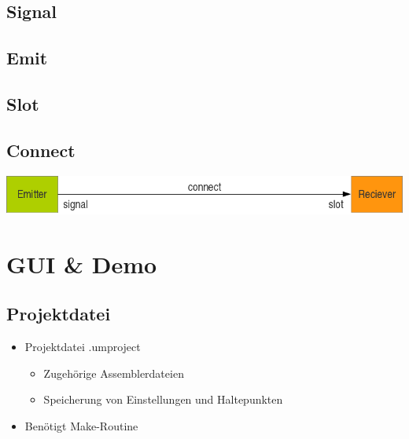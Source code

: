 \subsection{Signal}

\begin{frame}[fragile]{\insertsubsection}
	
\end{frame}

\subsection{Emit}

\begin{frame}[fragile]{\insertsubsection}
	
\end{frame}

\subsection{Slot}

\begin{frame}[fragile]{\insertsubsection}
	
\end{frame}

\subsection{Connect}

\begin{frame}[fragile]{\insertsubsection}
	\includegraphics[width=\textwidth]{g4}
	
	
\end{frame}

\section{GUI \& Demo}

\subsection{Projektdatei}

\begin{frame}{\insertsubsection}
    \begin{itemize}
         \item Projektdatei .umproject
         \begin{itemize}
         	\item Zugehörige Assemblerdateien
			\item Speicherung von Einstellungen und Haltepunkten
    	 \end{itemize}
         \item Benötigt Make-Routine
    \end{itemize}
\end{frame}

